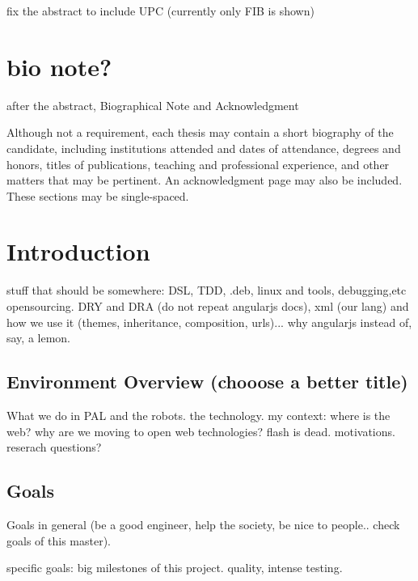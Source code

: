 
fix the abstract to include UPC (currently only FIB is shown)

\chapter{bio note?}
after the abstract, Biographical Note and Acknowledgment

Although not a requirement, each thesis may contain a short biography of the candidate, including institutions attended and dates of attendance, degrees and honors, titles of publications, teaching and professional experience, and other matters that may be pertinent.  An acknowledgment page may also be included.  These sections may be single-spaced.\cite{Darwin} \cite{Crockford} \cite{Stefanov} \cite{AngularJSGuide} \cite{Fowler}


\chapter{Introduction}
stuff that should be somewhere: DSL, TDD, .deb, linux and tools, debugging,etc opensourcing. DRY and DRA (do not repeat angularjs docs), xml (our lang) and how we use it (themes, inheritance, composition, urls)...
why angularjs instead of, say, a lemon.

\section{Environment Overview (chooose a better title)}
What we do in PAL and the robots. the technology. my context: where is the web? why are we moving to open web technologies? flash is dead. motivations. reserach questions?

\section{Goals}
Goals in general (be a good engineer, help the society, be nice to people.. check goals of this master).

specific goals: big milestones of this project. quality, intense testing. 

